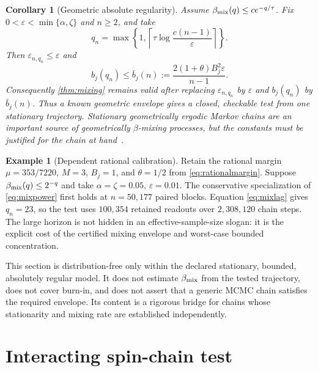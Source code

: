 \documentclass[11pt]{article}
\newtheorem{corollary}[theorem]{Corollary}
\theoremstyle{definition}
\newtheorem{example}[theorem]{Example}
\theoremstyle{remark}
\begin{document}
\begin{corollary}[Geometric absolute regularity]             \label{cor:geomix}
Assume $\beta_{\rm mix}(q)\leq c e^{-q/\tau}$.  Fix
$0<\varepsilon<\min\{\alpha,\zeta\}$ and $n\geq2$, and take
\begin{equation}
 q_n=\max\!\left\{1,
 \left\lceil\tau\log\frac{c(n-1)}{\varepsilon}\right\rceil\right\}.
                                                               \label{eq:mixlag}
\end{equation}
Then $\varepsilon_{n,q_n}\leq\varepsilon$ and
\begin{equation}
 b_j(q_n)\leq\bar b_j(n):=
 \frac{2(1+\theta)B_j^2\varepsilon}{n-1}.                \label{eq:mixbarbias}
\end{equation}
Consequently \cref{thm:mixing} remains valid after replacing
$\varepsilon_{n,q_n}$ by $\varepsilon$ and $b_j(q_n)$ by $\bar b_j(n)$.
Thus a known geometric envelope gives a closed, checkable test from one
stationary trajectory.  Stationary geometrically ergodic Markov chains are an
important source of geometrically $\beta$-mixing processes, but the constants
must be justified for the chain at hand~\cite{MeitzSaikkonen2021}.
\end{corollary}

\begin{example}[Dependent rational calibration]
Retain the rational margin $\mu=353/7220$, $M=3$, $B_j=1$, and
$\theta=1/2$ from \cref{eq:rationalmargin}.  Suppose
$\beta_{\rm mix}(q)\leq2^{-q}$ and take
$\alpha=\zeta=0.05$, $\varepsilon=0.01$.  The conservative specialization of
\eqref{eq:mixpower} first holds at $n=50{,}177$ paired blocks.  Equation
\eqref{eq:mixlag} gives $q_n=23$, so the test uses $100{,}354$ retained
readouts over $2{,}308{,}120$ chain steps.  The large horizon is not hidden in
an effective-sample-size slogan: it is the explicit cost of the certified
mixing envelope and worst-case bounded concentration.
\end{example}

This section is distribution-free only within the declared stationary,
bounded, absolutely regular model.  It does not estimate
$\beta_{\rm mix}$ from the tested trajectory, does not cover burn-in, and does
not assert that a generic MCMC chain satisfies the required envelope.  Its
content is a rigorous bridge for chains whose stationarity and mixing rate are
established independently.

\section{Interacting spin-chain test}
\end{document}
